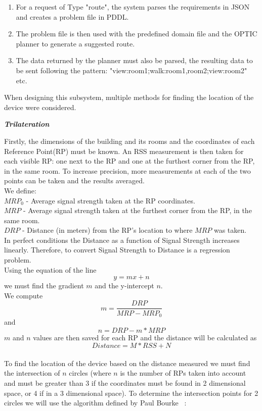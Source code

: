 \begin{enumerate}
\item For a request of Type "route", the system parses the requirements in JSON and creates a problem file in PDDL. 
\item The problem file is then used with the predefined domain file and the OPTIC planner to generate a suggested route.
\item The data returned by the planner must also be parsed, the resulting data to be sent following the pattern:
 "view:room1;walk:room1,room2;view:room2" etc.
\end{enumerate}

\noindent When designing this subsystem, multiple methods for finding the location of the device were considered.

\noindent \textit{\textbf{Trilateration}}

Firstly, the dimensions of the building and its rooms and the coordinates of each Reference Point(RP) must be known. An RSS measurement is then taken for each visible RP: one next to the RP and one at the furthest corner from the RP, in the same room. To increase precision, more measurements at each of the two points can be taken and the results averaged. \\ 
We define: \\
$MRP_0$ - Average signal strength taken at the RP coordinates. \\
$MRP$ - Average signal strength taken at the furthest corner from the RP, in the same room. \\
$DRP$ - Distance (in meters) from the RP's location to where $MRP$ was taken.\\
In perfect conditions the Distance as a function of Signal Strength increases linearly. Therefore, to convert Signal Strength to Distance is a regression problem.\\
Using the equation of the line $$y = mx + n$$ we must find the gradient $m$ and the y-intercept $n$.\\
We compute $$m = \frac{DRP}{MRP - MRP_0}$$
and $$n  = DRP - m * MRP$$
$m$ and $n$ values are then saved for each RP and the distance will be calculated as $$Distance  = M * RSS + N$$
\\
To find the location of the device based on the distance measured we must find the intersection of $n$ circles (where $n$ is the number of RPs taken into account and must be greater than 3 if the coordinates must be found in 2 dimensional space, or 4 if in a 3 dimensional space).  To determine the intersection points for 2 circles we will use the algorithm defined by Paul Bourke ~\cite{Bourke}:\\
